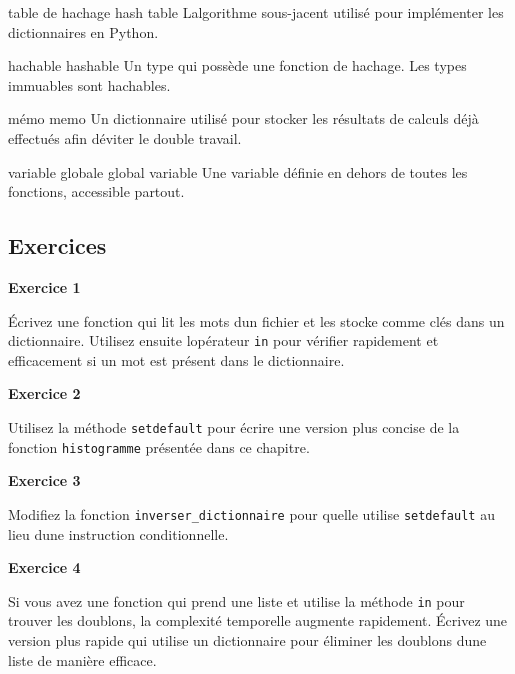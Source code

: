 table de hachage hash table L\textquotesingle algorithme sous-jacent
utilisé pour implémenter les dictionnaires en Python.

hachable hashable Un type qui possède une fonction de hachage. Les types
immuables sont hachables.

mémo memo Un dictionnaire utilisé pour stocker les résultats de calculs
déjà effectués afin d\textquotesingle éviter le double travail.

variable globale global variable Une variable définie en dehors de
toutes les fonctions, accessible partout.

\hypertarget{exercices}{%
\subsection{Exercices}\label{exercices}}

\textbf{Exercice 1}

Écrivez une fonction qui lit les mots d\textquotesingle un fichier et
les stocke comme clés dans un dictionnaire. Utilisez ensuite
l\textquotesingle opérateur \texttt{in} pour vérifier rapidement et
efficacement si un mot est présent dans le dictionnaire.

\textbf{Exercice 2}

Utilisez la méthode \texttt{setdefault} pour écrire une version plus
concise de la fonction \texttt{histogramme} présentée dans ce chapitre.

\textbf{Exercice 3}

Modifiez la fonction \texttt{inverser\_dictionnaire} pour
qu\textquotesingle elle utilise \texttt{setdefault} au lieu
d\textquotesingle une instruction conditionnelle.

\textbf{Exercice 4}

Si vous avez une fonction qui prend une liste et utilise la méthode
\texttt{in} pour trouver les doublons, la complexité temporelle augmente
rapidement. Écrivez une version plus rapide qui utilise un dictionnaire
pour éliminer les doublons d\textquotesingle une liste de manière
efficace.
